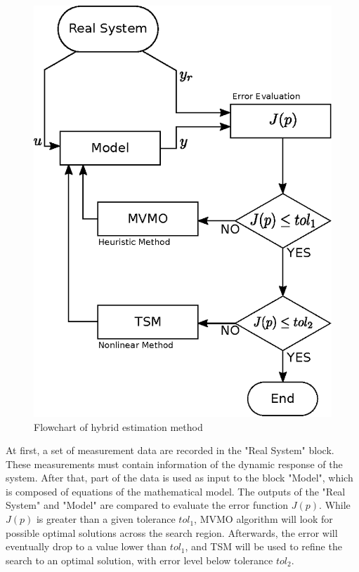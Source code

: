 \begin{figure}[h]
	\caption{Flowchart of hybrid estimation method}
	\begin{center}
		\includegraphics[scale=0.7]{Images/Flowchart.eps}
	\end{center}
	\label{fig: flowchart}
\end{figure}

At first, a set of measurement data are recorded in the "Real System" block. These measurements must contain information of the dynamic response of the system. After that, part of the data is used as input to the block "Model", which is composed of equations of the mathematical model. The outputs of the "Real System" and "Model" are compared to evaluate the error function $J(p)$. While $J(p)$ is greater than a given tolerance $tol_{1}$, MVMO algorithm will look for possible optimal solutions across the search region. Afterwards, the error will eventually drop to a value lower than $tol_{1}$, and TSM will be used to refine the search to an optimal solution, with error level below tolerance $tol_{2}$.

